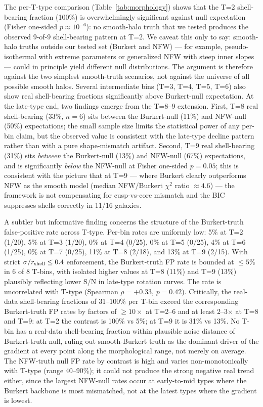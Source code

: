 The per-T-type comparison (Table~\ref{tab:morphology}) shows that the T=2 shell-bearing fraction (100\%) is overwhelmingly significant against null expectation (Fisher one-sided $p \approx 10^{-6}$): no smooth-halo truth that we tested produces the observed 9-of-9 shell-bearing pattern at T=2. We caveat this only to say: smooth-halo truths outside our tested set (Burkert and NFW) --- for example, pseudo-isothermal with extreme parameters or generalized NFW with steep inner slopes --- could in principle yield different null distributions. The argument is therefore against the two simplest smooth-truth scenarios, not against the universe of all possible smooth halos. Several intermediate bins (T=3, T=4, T=5, T=6) also show real shell-bearing fractions significantly above Burkert-null expectation. At the late-type end, two findings emerge from the T=8--9 extension. First, T=8 real shell-bearing (33\%, $n=6$) sits between the Burkert-null (11\%) and NFW-null (50\%) expectations; the small sample size limits the statistical power of any per-bin claim, but the observed value is consistent with the late-type decline pattern rather than with a pure shape-mismatch artifact. Second, T=9 real shell-bearing (31\%) sits \emph{between} the Burkert-null (13\%) and NFW-null (67\%) expectations, and is significantly \emph{below} the NFW-null at Fisher one-sided $p = 0.05$; this is consistent with the picture that at T=9 --- where Burkert clearly outperforms NFW as the smooth model (median NFW/Burkert $\chi^2$ ratio $\approx 4.6$) --- the framework is not compensating for cusp-vs-core mismatch and the BIC suppresses shells correctly in 11/16 galaxies.

A subtler but informative finding concerns the structure of the Burkert-truth false-positive rate across T-type. Per-bin rates are uniformly low: 5\% at T=2 (1/20), 5\% at T=3 (1/20), 0\% at T=4 (0/25), 0\% at T=5 (0/25), 4\% at T=6 (1/25), 0\% at T=7 (0/25), 11\% at T=8 (2/18), and 13\% at T=9 (2/15). With strict $\sigma/r_{\rm shell} \leq 0.4$ enforcement, the Burkert-truth FP rate is bounded at $\leq 5\%$ in 6 of 8 T-bins, with isolated higher values at T=8 (11\%) and T=9 (13\%) plausibly reflecting lower S/N in late-type rotation curves. The rate is uncorrelated with T-type (Spearman $\rho = +0.33$, $p = 0.42$). Critically, the real-data shell-bearing fractions of 31--100\% per T-bin exceed the corresponding Burkert-truth FP rates by factors of $\geq 10\times$ at T=2--6 and at least 2--3$\times$ at T=8 and T=9: at T=2 the contrast is 100\% vs 5\%; at T=9 it is 31\% vs 13\%. No T-bin has a real-data shell-bearing fraction within plausible noise distance of Burkert-truth null, ruling out smooth-Burkert truth as the dominant driver of the gradient at every point along the morphological range, not merely on average. The NFW-truth null FP rate by contrast is high and varies non-monotonically with T-type (range 40--90\%); it could not produce the strong negative real trend either, since the largest NFW-null rates occur at early-to-mid types where the Burkert backbone is most mismatched, not at the latest types where the gradient is lowest.

